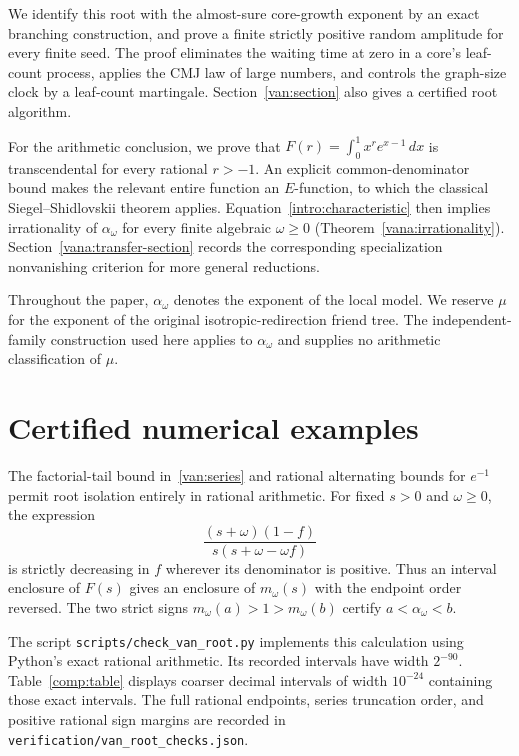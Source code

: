 \documentclass[11pt]{article}
\theoremstyle{definition}
\theoremstyle{remark}
\numberwithin{equation}{section}
\begin{document}
We identify this root with the almost-sure core-growth exponent by an
exact branching construction, and prove a finite strictly positive
random amplitude for every finite seed. The proof eliminates the
waiting time at zero in a core's leaf-count process, applies the CMJ
law of large numbers, and controls the graph-size clock by a leaf-count
martingale. Section~\ref{van:section} also gives a certified root
algorithm.

For the arithmetic conclusion, we prove that
$F(r)=\int_0^1 x^r e^{x-1}\,dx$ is transcendental for every rational
$r>-1$. An explicit common-denominator bound makes the relevant
entire function an $E$-function, to which the classical
Siegel--Shidlovskii theorem applies. Equation~\eqref{intro:characteristic}
then implies irrationality of $\alpha_\omega$ for every finite
algebraic $\omega\ge0$ (Theorem~\ref{vana:irrationality}).
Section~\ref{vana:transfer-section} records the corresponding
specialization nonvanishing criterion for more general reductions.

Throughout the paper, $\alpha_\omega$ denotes the exponent of the
local model. We reserve $\mu$ for the exponent of the original
isotropic-redirection friend tree. The independent-family construction
used here applies to $\alpha_\omega$ and supplies no arithmetic
classification of $\mu$.




\section{Certified numerical examples}
\label{comp:section}

The factorial-tail bound in~\eqref{van:series} and rational alternating
bounds for $e^{-1}$ permit root isolation entirely in rational
arithmetic. For fixed $s>0$ and $\omega\ge0$, the expression
\[
 \frac{(s+\omega)(1-f)}{s(s+\omega-\omega f)}
\]
is strictly decreasing in $f$ wherever its denominator is positive.
Thus an interval enclosure of $F(s)$ gives an enclosure of
$m_\omega(s)$ with the endpoint order reversed. The two strict signs
$m_\omega(a)>1>m_\omega(b)$ certify $a<\alpha_\omega<b$.

The script \texttt{scripts/check\_van\_root.py} implements this
calculation using Python's exact rational arithmetic. Its recorded
intervals have width $2^{-90}$. Table~\ref{comp:table} displays coarser
decimal intervals of width $10^{-24}$ containing those exact intervals.
The full rational endpoints, series truncation order, and positive
rational sign margins are recorded in
\texttt{verification/van\_root\_checks.json}.
\end{document}
